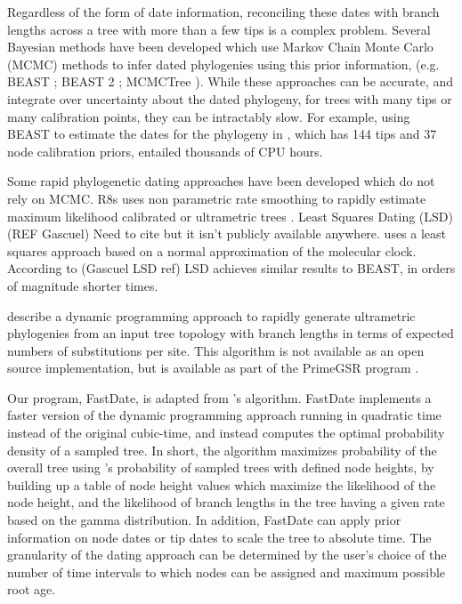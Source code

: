 \documentclass{llncs}
\newcommand{\ejmcomment}[1]{{\color{green} #1}}
\begin{document}
Regardless of the form of date information, reconciling these dates with 
branch lengths across a tree with more than a few tips is a complex problem.
Several Bayesian methods have been developed which use Markov Chain Monte Carlo (MCMC) methods
to infer dated phylogenies using this prior information, 
(e.g. BEAST \citealt{Drummond2007}; BEAST 2 \citealt{bouckaert2014}; MCMCTree \citealt{Stadler2013}).
While these approaches can be accurate, and integrate over uncertainty about the dated
phylogeny, for trees with many tips or many calibration points, they can be intractably slow.
For example, using BEAST to estimate the dates for the phylogeny in \citet{Misof2014}, which has 144 tips
and 37 node calibration priors, entailed thousands of CPU hours.

Some rapid phylogenetic dating approaches have been developed which do not rely on MCMC.\@
R8s uses non parametric rate smoothing to rapidly estimate 
maximum likelihood calibrated or ultrametric trees \citep{Sanderson2003}.
Least Squares Dating (LSD) (REF Gascuel) 
\ejmcomment{Need to cite but it isn't publicly available anywhere.}
uses a least squares approach based on a normal approximation of the molecular clock.
According to (Gascuel LSD ref) LSD achieves similar results to BEAST, 
in orders of magnitude shorter times.

\cite{Akerborg2008} describe a dynamic programming approach to 
rapidly generate ultrametric phylogenies from an input tree topology 
with branch lengths in terms of expected numbers of substitutions per site.
This algorithm is not available as an open source implementation, 
but is available as part of the PrimeGSR program \citep{Akerborg2009}.

Our program, FastDate, is adapted from \cite{Akerborg2008}'s algorithm.
FastDate implements a faster version of the dynamic programming approach running 
in quadratic time instead of the original cubic-time, and instead computes the 
optimal probability density of a sampled tree.
In short, the algorithm maximizes probability of the overall tree using \cite{Stadler2010}'s 
probability of sampled trees with defined node heights,
by building up a table of node height values which maximize the likelihood of 
the node height,  and the likelihood of branch lengths in the tree 
having a given rate based on the gamma distribution.
In addition, FastDate can apply prior information on node dates or tip dates to scale the tree to
absolute time.
The granularity of the dating approach can be determined by the user's choice of the number of time intervals to which 
nodes can be assigned and maximum possible root age.
\end{document}
